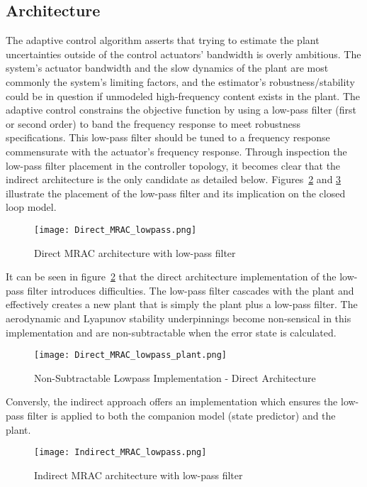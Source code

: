 \subsection{\Lone Architecture}
The \Lone adaptive control algorithm asserts that trying to estimate the plant uncertainties outside of the control actuators' bandwidth is overly ambitious.  The system's actuator bandwidth and the slow dynamics of the plant are most commonly the system's limiting factors, and the estimator's robustness/stability could be in question if unmodeled high-frequency content exists in the plant.  %
The \Lone adaptive control constrains the objective function by using a low-pass filter (first or second order) to band the frequency response to meet robustness specifications.  This low-pass filter should be tuned to a frequency response commensurate with the actuator's frequency response.  Through inspection the low-pass filter placement in the controller topology, it becomes clear that the indirect architecture is the only candidate as detailed below.  Figures~\ref{fig:direct_mrac_lowpass} and \ref{fig:indirect_mrac_lowpass} illustrate the placement of the low-pass filter and its implication on the closed loop model. 

\begin{figure}[h!]
 \centering
  \texttt{[image: Direct\_MRAC\_lowpass.png]}
  \caption{Direct \ac{MRAC} architecture with low-pass filter }
  \label{fig:direct_mrac_lowpass}
\end{figure}
 It can be seen in figure~\ref{fig:direct_mrac_lowpass} that the direct architecture implementation of the low-pass filter introduces difficulties.  The low-pass filter cascades with the plant and effectively creates a new plant that is simply the plant plus a low-pass filter.  The aerodynamic and Lyapunov stability underpinnings become non-sensical in this implementation and are non-subtractable when the error state is calculated.
\begin{figure}[h!]
 \centering
  \texttt{[image: Direct\_MRAC\_lowpass\_plant.png]}
  \caption{Non-Subtractable Lowpass Implementation - Direct Architecture}
  \label{fig:direct_mrac_lowpass}
\end{figure}

Conversly, the indirect approach offers an implementation which ensures the low-pass filter is applied to both the companion model (state predictor) and the plant.
\begin{figure}[h!]
 \centering
  \texttt{[image: Indirect\_MRAC\_lowpass.png]}
  \caption{Indirect \ac{MRAC} architecture with low-pass filter }
  \label{fig:indirect_mrac_lowpass}
\end{figure}

